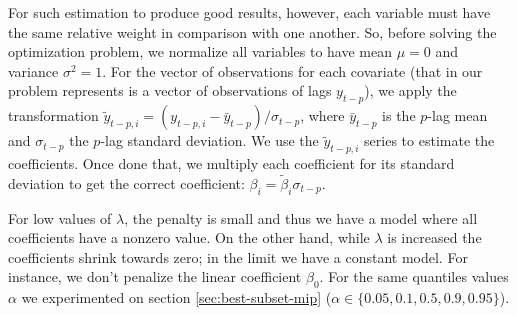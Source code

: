 For such estimation to produce good results, however, each variable must have the same relative weight in comparison with one another. So, before solving the optimization problem, we normalize all variables to have mean $\mu = 0$ and variance $\sigma^2 = 1$. For the vector of observations for each covariate (that in our problem represents is a vector of observations of lags $y_{t-p}$), we apply the transformation $\tilde{y}_{t-p,i} = (y_{t-p,i} - \bar{y}_{t-p}) / \sigma_{t-p}$, where $\bar{y}_{t-p}$ is the $p$-lag mean and $\sigma_{t-p}$ the $p$-lag standard deviation. We use the $\tilde{y}_{t-p,i}$ series to estimate the coefficients. Once done that, we multiply each coefficient for its standard deviation to get the correct coefficient: $\beta_i = \tilde{\beta}_i \sigma_{t-p}$.

For low values of $\lambda$, the penalty is small and thus we have a model where all coefficients have a nonzero value. On the other hand, while $\lambda$ is increased the coefficients shrink towards zero; in the limit we have a constant model. For instance, we don't penalize the linear coefficient $\beta_0$. For the same quantiles values $\alpha$ we experimented on section \ref{sec:best-subset-mip} ($\alpha \in \{0.05, 0.1, 0.5, 0.9, 0.95\}$). 

